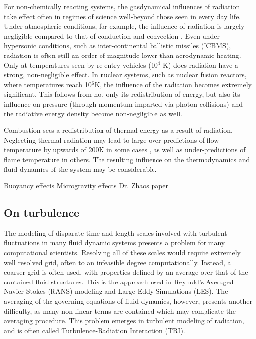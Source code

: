 For non-chemically reacting systems, the gasdynamical influences of radiation take effect often in regimes of science well-beyond those seen in every day life. Under atmospheric conditions, for example, the influence of radiation is largely negligible compared to that of conduction and convection \cite{Pai1966RadiationDynamics}.
Even under hypersonic conditions, such as inter-continental ballistic missiles (ICBMS), radiation is often still an order of magnitude lower than aerodynamic heating. Only at temperatures seen by re-entry vehicles (10$^4$ K) does radiation have a strong, non-negligible effect.
In nuclear systems, such as nuclear fusion reactors, where temperatures reach 10$^6$K, the influence of the radiation becomes extremely significant. This follows from not only its redistribution of energy, but also its influence on pressure (through momentum imparted via photon collisions) and the radiative energy density become non-negligible as well. 



Combustion sees a redistribution of thermal energy as a result of radiation. 
Neglecting thermal radiation may lead to large over-predictions of flow temperature by upwards of 200K in some cases \cite{Modest2016RadiativeSystems,Wu2021LimitationsFires,Coelho2018RadiativeSystems}, as well as under-predictions of flame temperature in others. The resulting influence on the thermodynamics and fluid dynamics of the system may be considerable.

Buoyancy effects
Microgravity effects
Dr. Zhaos paper



\subsection{On turbulence}
The modeling of disparate time and length scales involved with turbulent fluctuations in many fluid dynamic systems presents a problem for many computational scientists.
Resolving all of these scales would require extremely well resolved grid, often to an infeasible degree computationally. 
Instead, a coarser grid is often used, with properties defined by an average over that of the contained fluid structures. This is the approach used in Reynold's Averaged Navier Stokes (RANS) modeling and Large Eddy Simulations (LES).
The averaging of the governing equations of fluid dynamics, however, presents another difficulty, as many non-linear terms are contained which may complicate the averaging procedure.
This problem emerges in turbulent modeling of radiation, and is often called Turbulence-Radiation Interaction (TRI).

